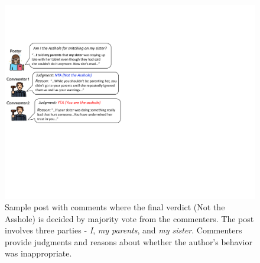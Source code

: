 \documentclass[letterpaper]{article} %
\begin{document}
\begin{figure}
    \centering
    \includegraphics[clip, trim=0.2cm 8cm 15cm 4cm, scale=0.6]{figs/tease.pdf}
    \caption{Sample post with comments where the final verdict (Not the Asshole) is decided by majority vote from the commenters. The post involves three parties - \emph{I}, \emph{my parents}, and \emph{my sister}. Commenters provide judgments and reasons about whether the author's behavior was inappropriate.}
    \label{fig:teaser}
\end{figure}
\end{document}
